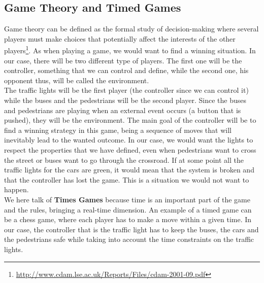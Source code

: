 \subsection{Game Theory and Timed Games} \label{sec:game}
Game theory can be defined as the formal study of decision-making where several players must make choices that potentially affect the interests of the other players\footnote{\url{http://www.cdam.lse.ac.uk/Reports/Files/cdam-2001-09.pdf}}. As when playing a game, we would want to find a winning situation. In our case, there will be two different type of players. The first one will be the controller, something that we can control and define, while the second one, his opponent thus, will be called the environment. \\
The traffic lights will be the first player (the controller since we can control it) while the buses and the pedestrians will be the second player. Since the buses and pedestrians are playing when an external event occurs (a button that is pushed), they will be the environment. The main goal of the controller will be to find a winning strategy in this game, being a sequence of moves
that will inevitably lead to the wanted outcome. In our case, we would want the lights to respect the properties that we have defined, even when pedestrians want to cross the street or buses want to go through the crossroad. If at some point all the traffic lights for the cars are green, it would mean that the system is broken and that the controller has lost the game. This is a situation we would not want to happen. \\
We here talk of \textbf{Times Games} because time is an important part of the game and the rules, bringing a real-time dimension. An example of a timed game can be a chess game, where each player has to make a move within a given time. In our case, the controller that is the traffic light has to keep the buses, the cars and the pedestrians safe while taking into account the time constraints on the traffic lights.